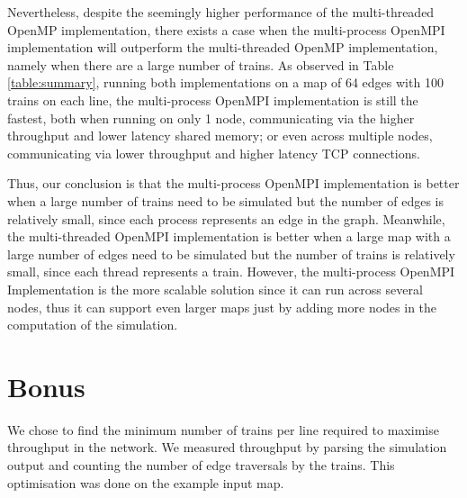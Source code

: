 \documentclass[a4paper,12pt]{article}
\begin{document}
Nevertheless, despite the seemingly higher performance of the multi-threaded OpenMP implementation, there exists a case when the multi-process OpenMPI implementation will outperform the multi-threaded OpenMP implementation, namely when there are a large number of trains. As observed in Table \ref{table:summary}, running both implementations on a map of 64 edges with 100 trains on each line, the multi-process OpenMPI implementation is still the fastest, both when running on only 1 node, communicating via the higher throughput and lower latency shared memory; or even across multiple nodes, communicating via lower throughput and higher latency TCP connections.

Thus, our conclusion is that the multi-process OpenMPI implementation is better when a large number of trains need to be simulated but the number of edges is relatively small, since each process represents an edge in the graph. Meanwhile, the multi-threaded OpenMPI implementation is better when a large map with a large number of edges need to be simulated but the number of trains is relatively small, since each thread represents a train. However, the multi-process OpenMPI Implementation is the more scalable solution since it can run across several nodes, thus it can support even larger maps just by adding more nodes in the computation of the simulation.

\section{Bonus}

We chose to find the minimum number of trains per line required to maximise throughput in the network. We measured throughput by parsing the simulation output and counting the number of edge traversals by the trains. This optimisation was done on the example input map.
\end{document}
